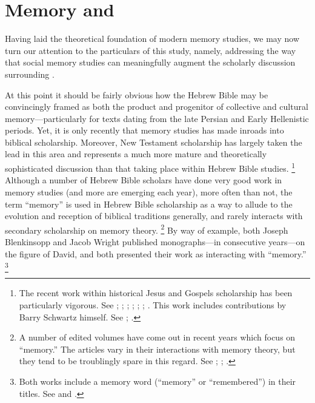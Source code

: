 \section{Memory and \rwb}

Having laid the theoretical foundation of modern memory studies, we may now turn our attention to the particulars of this study, namely, addressing the way that social memory studies can meaningfully augment the scholarly discussion surrounding \rwb.%
    \autocite[See also][]{brooke_zsengeller2014}  

At this point it should be fairly obvious how the Hebrew Bible may be convincingly framed as both the product and progenitor of collective and cultural memory---particularly for texts dating from the late Persian and Early Hellenistic periods. Yet, it is only recently that memory studies has made inroads into biblical scholarship. Moreover, New Testament scholarship has largely taken the lead in this area and represents a much more mature and theoretically sophisticated discussion than that taking place within Hebrew Bible studies.%
    \footnote{%
        The recent work within historical Jesus and Gospels scholarship has been particularly vigorous. See 
            \cite{keith_ec2015};
            \cite{keith_ec2015b};
            \cite{thatcher2014};
            \cite{rodriguez2010};
            \cite{ledonne2009};
            \cite{hubenthal_carstens-hasselbalch2012};
            \cite{kirk-thatcher2005}. This work includes contributions by Barry Schwartz himself. See 
            \cite{schwartz_kirk-thatcher2005a};
            \cite{schwartz_kirk-thatcher2005b}.}
Although a number of Hebrew Bible scholars have done very good work in memory studies (and more are emerging each year), more often than not, the term ``memory'' is used in Hebrew Bible scholarship as a way to allude to the evolution and reception of biblical traditions generally, and rarely interacts with secondary scholarship on memory theory.%
    \footnote{%
        A number of edited volumes have come out in recent years which focus on ``memory.'' The articles vary in their interactions with memory theory, but they tend to be troublingly spare in this regard. See 
        \cite{edelman-benzvi2013};
        \cite{benzvi-levin2012};
        \cite{carstens-hasselbalch2012}.}
By way of example, both Joseph Blenkinsopp and Jacob Wright published monographs---in consecutive years---on the figure of David, and both presented their work as interacting with ``memory.''%
    \footnote{%
        Both works include a memory word (``memory'' or ``remembered'') in their titles. See \cite{blenkinsopp2013} and \cite{wright2014}.}

